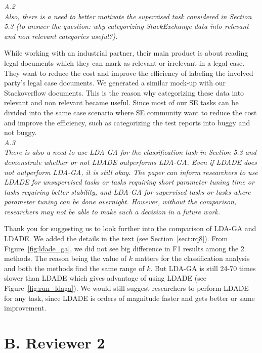 \documentclass[twocolumn,5p,sort&compress]{elsarticle}
\theoremstyle{break}
\begin{document}
\textit{A.2\\}
{\em Also, there is a need to better motivate the supervised task considered in Section 5.3  (to answer the question: why categorizing StackExchange data into relevant and non relevant categories useful?).\\}

While working with an industrial partner, their main product is about reading legal documents which they can mark as relevant or irrelevant in a legal case. They want to reduce the cost and improve the efficiency of labeling the involved party's legal case documents. We generated a similar mock-up with our Stackoverflow documents. This is the reason why categorizing these data into relevant and non relevant became useful. Since most of our SE tasks can be divided into the same case scenario where SE community want to reduce the cost and improve the efficiency, such as categorizing the test reports into buggy and not buggy.\\

\textit{A.3\\}
{\em There is also a need to use LDA-GA for the classification task in Section 5.3 and demonstrate whether or not LDADE outperforms LDA-GA. Even if LDADE does not outperform LDA-GA, it is still okay. The paper can inform researchers to use LDADE for unsupervised tasks or tasks requiring short parameter tuning time or tasks requiring better stability, and LDA-GA for supervised tasks or tasks where parameter tuning can be done overnight. However, without the comparison, researchers may not be able to make such a decision in a future work.\\}

Thank you for suggesting us to look further into the comparison of LDA-GA and LDADE. We added the details in the text (see Section~\ref{sect:rq8}). From Figure~\ref{fig:ldade_ga}, we did not see big difference in F1 results among the 2 methods. The reason being the value of $k$ matters for the classification analysis and both the methods find the same range of $k$. But LDA-GA is still 24-70 times slower than LDADE which gives advantage of using LDADE (see Figure~\ref{fig:run_ldaga}). We would still suggest researchers to perform LDADE for any task, since LDADE is orders of magnitude faster and gets better or same improvement.\\

\newpage
\section*{B. Reviewer 2}
\end{document}
